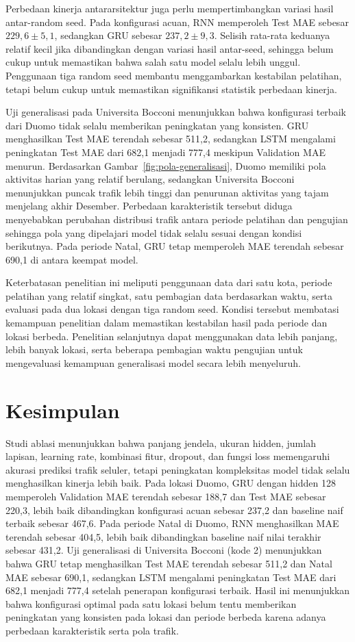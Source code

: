 \documentclass[conference,a4paper]{IEEEtran}
\begin{document}
Perbedaan kinerja antararsitektur juga perlu mempertimbangkan variasi hasil antar-random seed. Pada konfigurasi acuan, RNN memperoleh Test MAE sebesar $229,6 \pm 5,1$, sedangkan GRU sebesar $237,2 \pm 9,3$. Selisih rata-rata keduanya relatif kecil jika dibandingkan dengan variasi hasil antar-seed, sehingga belum cukup untuk memastikan bahwa salah satu model selalu lebih unggul. Penggunaan tiga random seed membantu menggambarkan kestabilan pelatihan, tetapi belum cukup untuk memastikan signifikansi statistik perbedaan kinerja.

Uji generalisasi pada Universita Bocconi menunjukkan bahwa konfigurasi terbaik dari Duomo tidak selalu memberikan peningkatan yang konsisten. GRU menghasilkan Test MAE terendah sebesar 511,2, sedangkan LSTM mengalami peningkatan Test MAE dari 682,1 menjadi 777,4 meskipun Validation MAE menurun. Berdasarkan Gambar~\ref{fig:pola-generalisasi}, Duomo memiliki pola aktivitas harian yang relatif berulang, sedangkan Universita Bocconi menunjukkan puncak trafik lebih tinggi dan penurunan aktivitas yang tajam menjelang akhir Desember. Perbedaan karakteristik tersebut diduga menyebabkan perubahan distribusi trafik antara periode pelatihan dan pengujian sehingga pola yang dipelajari model tidak selalu sesuai dengan kondisi berikutnya. Pada periode Natal, GRU tetap memperoleh MAE terendah sebesar 690,1 di antara keempat model.

Keterbatasan penelitian ini meliputi penggunaan data dari satu kota, periode pelatihan yang relatif singkat, satu pembagian data berdasarkan waktu, serta evaluasi pada dua lokasi dengan tiga random seed. Kondisi tersebut membatasi kemampuan penelitian dalam memastikan kestabilan hasil pada periode dan lokasi berbeda. Penelitian selanjutnya dapat menggunakan data lebih panjang, lebih banyak lokasi, serta beberapa pembagian waktu pengujian untuk mengevaluasi kemampuan generalisasi model secara lebih menyeluruh.


\section{Kesimpulan}
Studi ablasi menunjukkan bahwa panjang jendela, ukuran hidden, jumlah lapisan, learning rate, kombinasi fitur, dropout, dan fungsi loss memengaruhi akurasi prediksi trafik seluler, tetapi peningkatan kompleksitas model tidak selalu menghasilkan kinerja lebih baik. Pada lokasi Duomo, GRU dengan hidden 128 memperoleh Validation MAE terendah sebesar 188,7 dan Test MAE sebesar 220,3, lebih baik dibandingkan konfigurasi acuan sebesar 237,2 dan baseline naif terbaik sebesar 467,6. Pada periode Natal di Duomo, RNN menghasilkan MAE terendah sebesar 404,5, lebih baik dibandingkan baseline naif nilai terakhir sebesar 431,2. Uji generalisasi di Universita Bocconi (kode 2) menunjukkan bahwa GRU tetap menghasilkan Test MAE terendah sebesar 511,2 dan Natal MAE sebesar 690,1, sedangkan LSTM mengalami peningkatan Test MAE dari 682,1 menjadi 777,4 setelah penerapan konfigurasi terbaik. Hasil ini menunjukkan bahwa konfigurasi optimal pada satu lokasi belum tentu memberikan peningkatan yang konsisten pada lokasi dan periode berbeda karena adanya perbedaan karakteristik serta pola trafik.
\end{document}
